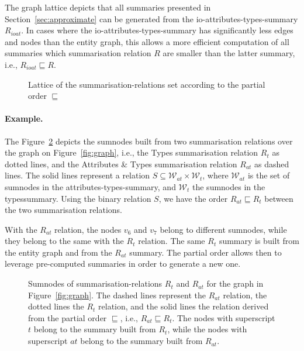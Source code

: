 \begin{remark}
The graph lattice depicts that all summaries presented in Section~\ref{sec:approximate} can be generated from the \gls{io-attributes-types-summary} $R_{ioat}$. In cases where the \gls{io-attributes-types-summary} has significantly less edges and nodes than the entity graph, this allows a more efficient computation of all summaries which summarisation relation $R$ are smaller than the latter summary, i.e., $R_{ioat} \sqsubseteq R$.
\end{remark}

\begin{figure}
	\centering
	
	\caption{Lattice of the \glspl{summarisation-relation} set according to the partial order $\sqsubseteq$}
	\label{fig:lattice}
\end{figure}

\paragraph{Example.}

The Figure~\ref{fig:rel-order} depicts the sumnodes built from two summarisation relations over the graph on Figure~\ref{fig:graph}, i.e., the Types summarisation relation $R_t$ as dotted lines, and the Attributes \& Types summarisation relation $R_{at}$ as dashed lines. The solid lines represent a relation $S \subseteq \mathcal{W}_{at} \times \mathcal{W}_t$, where $\mathcal{W}_{at}$ is the set of sumnodes in the \gls{attributes-types-summary}, and $\mathcal{W}_{t}$ the sumnodes in the \gls{typessummary}.
Using the binary relation $S$, we have the order $R_{at} \sqsubseteq R_t$ between the two summarisation relations.

With the $R_{at}$ relation, the nodes $v_6$ and $v_7$ belong to different sumnodes, while they belong to the same with the $R_t$ relation. The same $R_t$ summary is built from the entity graph and from the $R_{at}$ summary. The partial order allows then to leverage pre-computed summaries in order to generate a new one.

\begin{figure}
	\centering
	
	\caption[Ordering of graph summaries]{Sumnodes of \glspl{summarisation-relation} $R_t$ and $R_{at}$ for the graph in Figure~\ref{fig:graph}. The dashed lines represent the $R_{at}$ relation, the dotted lines the $R_t$ relation, and the solid lines the relation derived from the partial order $\sqsubseteq$, i.e., $R_{at} \sqsubseteq R_t$. The nodes with superscript $t$ belong to the summary built from $R_t$, while the nodes with superscript $at$ belong to the summary built from $R_{at}$.}
	\label{fig:rel-order}
\end{figure}


